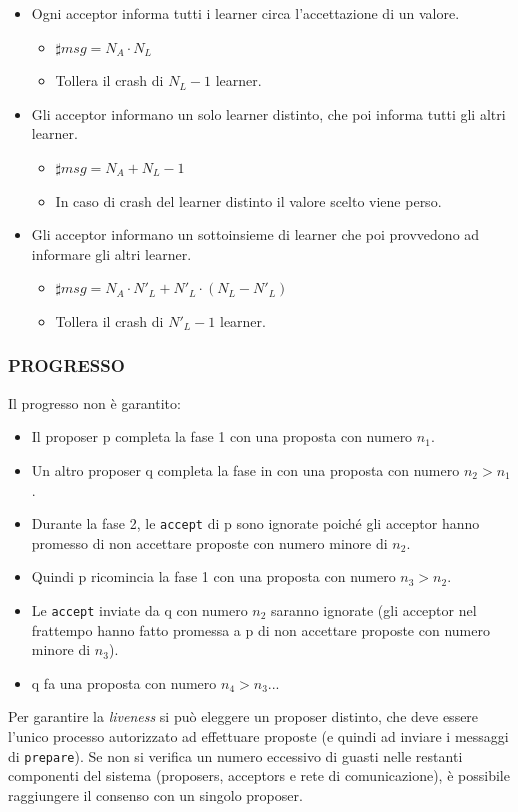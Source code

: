 \begin{itemize}
    \item Ogni acceptor informa tutti i learner circa l'accettazione di un valore.
    \begin{itemize}
        \item $\sharp msg = N_{A} \cdot N_{L}$
        \item Tollera il crash di $N_{L}-1$ learner.
    \end{itemize}
    \item Gli acceptor informano un solo learner distinto, che poi informa tutti gli altri learner.
    \begin{itemize}
        \item $\sharp msg = N_{A} + N_{L}-1$
        \item In caso di crash del learner distinto il valore scelto viene perso.
    \end{itemize}
    \item Gli acceptor informano un sottoinsieme di learner che poi provvedono ad informare gli altri learner.
    \begin{itemize}
        \item $\sharp msg = N_{A} \cdot N'_{L} + N'_{L} \cdot (N_{L} - N'_{L})$
        \item Tollera il crash di $N'_{L}-1$ learner.
    \end{itemize}
\end{itemize}
\subsubsection{PROGRESSO}
Il progresso non è garantito:
\begin{itemize}
    \item Il proposer p completa la fase 1 con una proposta con numero $n_{1}$.
    \item Un altro proposer q completa la fase in con una proposta con numero $n_{2} > n_{1}$.
    \item Durante la fase 2, le \texttt{accept} di p sono ignorate poiché gli acceptor hanno promesso di non accettare proposte con numero minore di $n_{2}$.
    \item Quindi p ricomincia la fase 1 con una proposta con numero $n_{3} > n_{2}$.
    \item Le \texttt{accept} inviate da q con numero $n_{2}$ saranno ignorate (gli acceptor nel frattempo hanno fatto promessa a p di non accettare proposte con numero minore di $n_{3}$).
    \item q fa una proposta con numero $n_{4} > n_{3}$...
\end{itemize}
Per garantire la \textit{liveness} si può eleggere un proposer distinto, che deve essere l'unico processo autorizzato ad effettuare proposte (e quindi ad inviare i messaggi di \texttt{prepare}). Se non si verifica un numero eccessivo di guasti nelle restanti componenti del sistema (proposers, acceptors e rete di comunicazione), è possibile raggiungere il consenso con un singolo proposer. 

